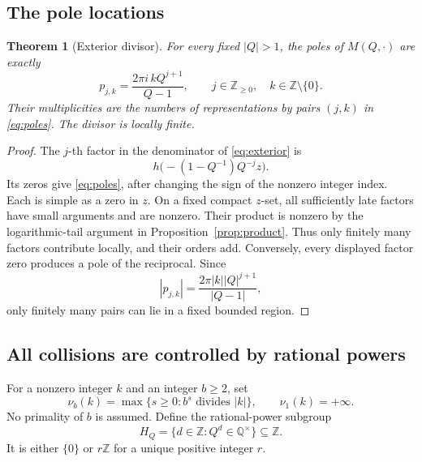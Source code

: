 \documentclass[11pt,a4paper]{article}
\numberwithin{equation}{section}
\newtheorem{theorem}{Theorem}[section]
\theoremstyle{definition}
\theoremstyle{remark}
\newcommand{\Q}{\mathbb Q}
\newcommand{\Z}{\mathbb Z}
\begin{document}
\subsection{The pole locations}
\begin{theorem}[Exterior divisor]\label{thm:exterior-poles}
For every fixed \(|Q|>1\), the poles of \(M(Q,\cdot)\) are exactly
\begin{equation}\label{eq:poles}
 p_{j,k}=\frac{2\pi i\,kQ^{j+1}}{Q-1},
 \qquad j\in\Z_{\ge0},\quad k\in\Z\setminus\{0\}.
\end{equation}
Their multiplicities are the numbers of representations by pairs \((j,k)\) in \eqref{eq:poles}. The divisor is locally finite.
\end{theorem}
\begin{proof}
The \(j\)-th factor in the denominator of \eqref{eq:exterior} is
\[
 h\bigl(-(1-Q^{-1})Q^{-j}z\bigr).
\]
Its zeros give \eqref{eq:poles}, after changing the sign of the nonzero integer index. Each is simple as a zero in \(z\). On a fixed compact \(z\)-set, all sufficiently late factors have small arguments and are nonzero. Their product is nonzero by the logarithmic-tail argument in Proposition~\ref{prop:product}. Thus only finitely many factors contribute locally, and their orders add. Conversely, every displayed factor zero produces a pole of the reciprocal. Since
\[
 |p_{j,k}|=\frac{2\pi|k||Q|^{j+1}}{|Q-1|},
\]
only finitely many pairs can lie in a fixed bounded region.
\end{proof}

\subsection{All collisions are controlled by rational powers}
For a nonzero integer \(k\) and an integer \(b\ge2\), set
\[
 \nu_b(k)=\max\{s\ge0:b^s\text{ divides }|k|\},
 \qquad \nu_1(k)=+\infty.
\]
No primality of \(b\) is assumed. Define the rational-power subgroup
\begin{equation}\label{eq:HQ}
 H_Q=\{d\in\Z:Q^d\in\Q^{\times}\}\subseteq\Z.
\end{equation}
It is either \(\{0\}\) or \(r\Z\) for a unique positive integer \(r\).
\end{document}
